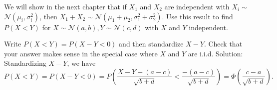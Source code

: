 

\setcounter{theorem}{24}
\begin{exercise}[BH.5.25] We will show in the next chapter that if $X_1$ and $X_2$ are independent with $X_i \sim$ $\mathcal{N}\left(\mu_i, \sigma_i^2\right)$, then $X_1+X_2 \sim \mathcal{N}\left(\mu_1+\mu_2, \sigma_1^2+\sigma_2^2\right)$. Use this result to find $P(X<Y)$ for $X \sim \mathcal{N}(a, b), Y \sim \mathcal{N}(c, d)$ with $X$ and $Y$ independent. 
\begin{solution}
    Write $P(X<Y)=P(X-Y<0)$ and then standardize $X-Y$. Check that your answer makes sense in the special case where $X$ and $Y$ are i.i.d.
    Solution: Standardizing $X-Y$, we have
    $$
    P(X<Y)=P(X-Y<0)=P\left(\frac{X-Y-(a-c)}{\sqrt{b+d}}<\frac{-(a-c)}{\sqrt{b+d}}\right)=\Phi\left(\frac{c-a}{\sqrt{b+d}}\right) .
    $$
\end{solution}
\end{exercise}


